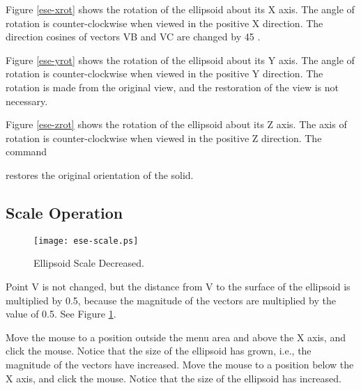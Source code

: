 Figure \ref{ese-xrot} shows the rotation of the ellipsoid about its X axis.
The angle of rotation is counter-clockwise when viewed in the positive X
direction.  The direction cosines of vectors VB and VC are changed by 45 .


Figure \ref{ese-yrot} shows the rotation of the ellipsoid about its Y axis.
The angle
of rotation is counter-clockwise when viewed in the positive Y direction.  The
rotation is made from the original view, and the restoration of the view is
not necessary.


Figure \ref{ese-zrot} shows the rotation of the ellipsoid about its Z axis.
The axis
of rotation is counter-clockwise when viewed in the positive Z direction.
The command


restores the original orientation of the solid.

\subsection{Scale Operation}

\begin{figure}
\centering \texttt{[image: ese-scale.ps]}
\caption{Ellipsoid Scale Decreased.}
\label{ese-scale}
\end{figure}


Point V is not changed,
but the distance from V to the surface of the ellipsoid is multiplied by 0.5,
because the magnitude of the vectors are multiplied by the value of 0.5.
See Figure \ref{ese-scale}.

Move the mouse to a position outside the menu area and above the X axis,
and click the mouse.
Notice that the size of the ellipsoid has grown, i.e.,
the magnitude of the vectors have increased.
Move the mouse to a position below the X axis, and click the mouse.
Notice that the size of the ellipsoid has increased.

